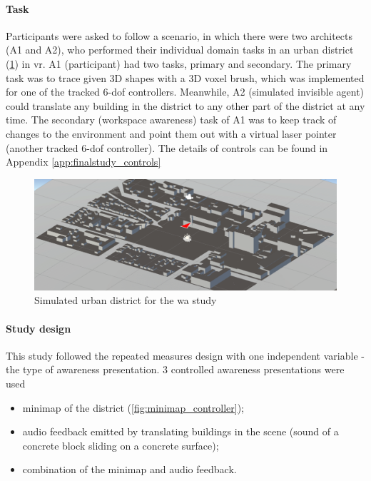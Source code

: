 \paragraph{Task}
Participants were asked to follow a scenario, in which there were two architects (A1 and A2), who performed their individual domain tasks in an urban district (\ref{fig:urbandistrict}) in \gls{vr}. A1 (participant) had two tasks, primary and secondary. The primary task was to trace given 3D shapes with a 3D voxel brush, which was implemented for one of the tracked 6-\gls{dof} controllers. Meanwhile, A2 (simulated invisible agent) could translate any building in the district to any other part of the district at any time. The secondary (workspace awareness) task of A1 was to keep track of changes to the environment and point them out with a virtual laser pointer (another tracked 6-\gls{dof} controller). The details of controls can be found in Appendix \ref{app:finalstudy_controls}

\begin{figure}
	\centering
	\includegraphics[width=0.7\linewidth]{figures/urban_district}
	\caption{Simulated urban district for the \gls{wa} study}
	\label{fig:urbandistrict}
\end{figure}



\paragraph{Study design}
This study followed the repeated measures design with one independent variable - the type of awareness presentation. 3 controlled awareness presentations were used
\begin{itemize}
	\item minimap of the district (\ref{fig:minimap_controller});
	\item audio feedback emitted by translating buildings in the scene (sound of a concrete block sliding on a concrete surface);
	\item combination of the minimap and audio feedback.
\end{itemize}

